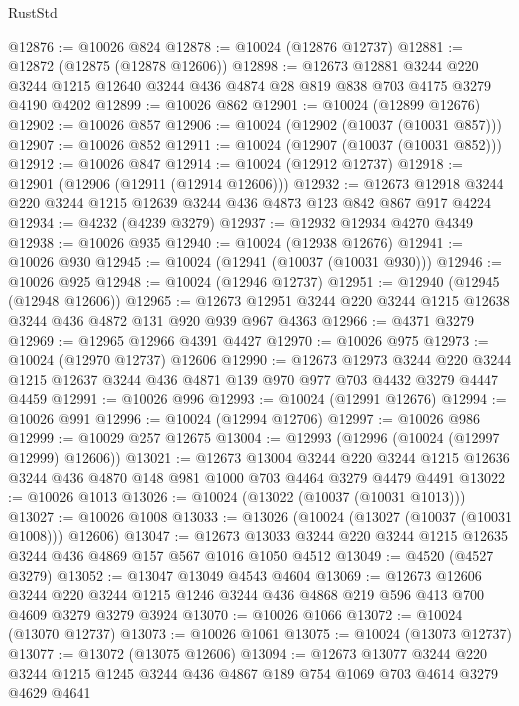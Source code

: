 \begin{lexlean}{RustStd}
\begin{coremodule}
{\begin{coremodule}
{{{{{{{{{{{{{{{{{{{{{{{{{{@12876 := @10026 @824
@12878 := @10024 (@12876 @12737)
@12881 := @12872 (@12875 (@12878 @12606))
@12898 := @12673
    @12881
    @3244
    @220
    @3244
    @1215
    @12640
    @3244
    @436
    @4874
    @28
    @819
    @838
    @703
    @4175
    @3279
    @4190
    @4202
@12899 := @10026 @862
@12901 := @10024 (@12899 @12676)
@12902 := @10026 @857
@12906 := @10024 (@12902 (@10037 (@10031 @857)))
@12907 := @10026 @852
@12911 := @10024 (@12907 (@10037 (@10031 @852)))
@12912 := @10026 @847
@12914 := @10024 (@12912 @12737)
@12918 := @12901 (@12906 (@12911 (@12914 @12606)))
@12932 := @12673 @12918 @3244 @220 @3244 @1215 @12639 @3244 @436 @4873 @123 @842 @867 @917 @4224
@12934 := @4232 (@4239 @3279)
@12937 := @12932 @12934 @4270 @4349
@12938 := @10026 @935
@12940 := @10024 (@12938 @12676)
@12941 := @10026 @930
@12945 := @10024 (@12941 (@10037 (@10031 @930)))
@12946 := @10026 @925
@12948 := @10024 (@12946 @12737)
@12951 := @12940 (@12945 (@12948 @12606))
@12965 := @12673 @12951 @3244 @220 @3244 @1215 @12638 @3244 @436 @4872 @131 @920 @939 @967 @4363
@12966 := @4371 @3279
@12969 := @12965 @12966 @4391 @4427
@12970 := @10026 @975
@12973 := @10024 (@12970 @12737) @12606
@12990 := @12673
    @12973
    @3244
    @220
    @3244
    @1215
    @12637
    @3244
    @436
    @4871
    @139
    @970
    @977
    @703
    @4432
    @3279
    @4447
    @4459
@12991 := @10026 @996
@12993 := @10024 (@12991 @12676)
@12994 := @10026 @991
@12996 := @10024 (@12994 @12706)
@12997 := @10026 @986
@12999 := @10029 @257 @12675
@13004 := @12993 (@12996 (@10024 (@12997 @12999) @12606))
@13021 := @12673
    @13004
    @3244
    @220
    @3244
    @1215
    @12636
    @3244
    @436
    @4870
    @148
    @981
    @1000
    @703
    @4464
    @3279
    @4479
    @4491
@13022 := @10026 @1013
@13026 := @10024 (@13022 (@10037 (@10031 @1013)))
@13027 := @10026 @1008
@13033 := @13026 (@10024 (@13027 (@10037 (@10031 @1008))) @12606)
@13047 := @12673 @13033 @3244 @220 @3244 @1215 @12635 @3244 @436 @4869 @157 @567 @1016 @1050 @4512
@13049 := @4520 (@4527 @3279)
@13052 := @13047 @13049 @4543 @4604
@13069 := @12673
    @12606
    @3244
    @220
    @3244
    @1215
    @1246
    @3244
    @436
    @4868
    @219
    @596
    @413
    @700
    @4609
    @3279
    @3279
    @3924
@13070 := @10026 @1066
@13072 := @10024 (@13070 @12737)
@13073 := @10026 @1061
@13075 := @10024 (@13073 @12737)
@13077 := @13072 (@13075 @12606)
@13094 := @12673
    @13077
    @3244
    @220
    @3244
    @1215
    @1245
    @3244
    @436
    @4867
    @189
    @754
    @1069
    @703
    @4614
    @3279
    @4629
    @4641
}}}}}}}}}}}}}}}}}}}}}}}}}}
\end{coremodule}}
\end{coremodule}
\end{lexlean}
